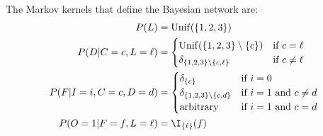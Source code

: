 \begin{enumerate}
\begin{gradedsolution}
\begin{enumerate}
      The Markov kernels that define the Bayesian network are:
      \begin{align*}
        P(L)                & = \mathrm{Unif}(\{1, 2, 3\})                                             \\
        P(D|C=c, L=\ell)    & = \begin{cases}
                                  \mathrm{Unif}(\{1, 2, 3\}\setminus \{c\}) & \text{if $c=\ell$}    \\
                                  \delta_{\{1, 2, 3\}\setminus \{c, \ell\}} & \text{if $c\neq\ell$}
                                \end{cases}      \\
        P(F|I=i, C=c, D=d)  & = \begin{cases}
                                  \delta_{\{c\}}                         & \text{if $i=0$}               \\
                                  \delta_{\{1, 2, 3\}\setminus \{c, d\}} & \text{if $i=1$ and $c\neq d$} \\
                                  \text{arbitrary}                       & \text{if $i=1$ and $c= d$}
                                \end{cases} \\
        P(O=1 |F=f, L=\ell) & = \I_{\{\ell\}}(f)
      \end{align*}



\end{enumerate}
\end{gradedsolution}
\end{enumerate}
